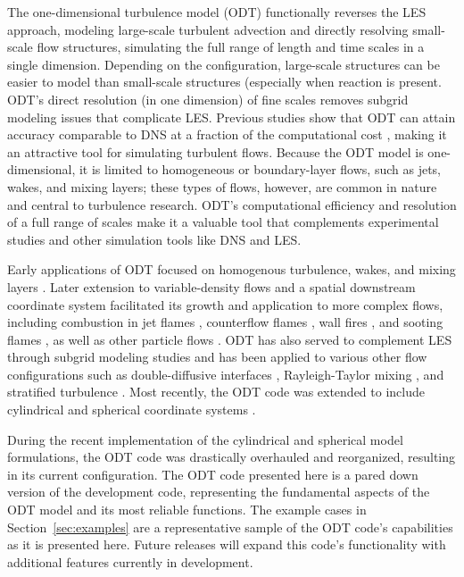 \documentclass[preprint,12pt, a4paper]{elsarticle}
\begin{document}
The one-dimensional turbulence model (ODT) functionally reverses the LES approach, modeling large-scale turbulent advection and directly resolving small-scale flow structures, simulating the full range of length and time scales in a single dimension. Depending on the configuration, large-scale structures can be easier to model than small-scale structures (especially when reaction is present. ODT's direct resolution (in one dimension) of fine scales removes subgrid modeling issues that complicate LES. Previous studies show that ODT can attain accuracy comparable to DNS at a fraction of the computational cost \cite{Lignell_2015,Abboud_2015}, making it an attractive tool for simulating turbulent flows. Because the ODT model is one-dimensional, it is limited to homogeneous or boundary-layer flows, such as jets, wakes, and mixing layers; these types of flows, however, are common in nature and central to turbulence research. ODT's computational efficiency and resolution of a full range of scales make it a valuable tool that complements experimental studies and other simulation tools like DNS and LES. 

Early applications of ODT focused on homogenous turbulence, wakes, and mixing layers \cite{Kerstein_1999,Kerstein_2000,Kerstein_2001}. Later extension to variable-density flows and a spatial downstream coordinate system facilitated its growth and application to more complex flows, including combustion in jet flames \cite{Echekki_2001,Hewson_2001,Hewson_2002,Lignell_2012,Punati_2011,Abdelsamie_2017,Lignell_2017, Goshayeshi_2015}, counterflow flames \cite{Jozefik_2015}, wall fires \cite{Monson_2016}, and sooting flames \cite{Lignell_2015,Hewson_2006,Hewson_2009,Lignell_2015b,Ricks_2010}, as well as other particle flows \cite{Sun_2017,Schmidt_2009,Sun_2014,Fistler_2017}. ODT has also served to complement LES through subgrid modeling studies \cite{Cao_2008,Schmidt_2003,Schmidt_2010} and has been applied to various other flow configurations such as double-diffusive interfaces \cite{GonzalezJuez_2011}, Rayleigh-Taylor mixing \cite{GonzalezJuez_2013}, and stratified turbulence \cite{Wunsch_2001}. Most recently, the ODT code was extended to include cylindrical and spherical coordinate systems \cite{Lignell_2018,Klein_2018,Klein_2019}.

During the recent implementation of the cylindrical and spherical model formulations, the ODT code was drastically overhauled and reorganized, resulting in its current configuration. The ODT code presented here is a pared down version of the development code, representing the fundamental aspects of the ODT model and its most reliable functions. The example cases in Section~\ref{sec:examples} are a representative sample of the ODT code's capabilities as it is presented here. Future releases will expand this code's functionality with additional features currently in development. 
\end{document}
